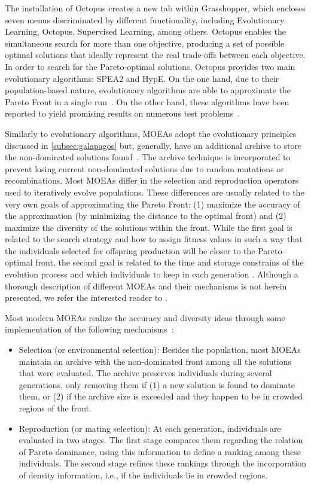 The installation of Octopus creates a new tab within Grasshopper, which encloses seven menus discriminated by different functionality, including Evolutionary Learning, Octopus, Supervised Learning, among others. Octopus enables the simultaneous search for more than one objective, producing a set of possible optimal solutions that ideally represent the real trade-offs between each objective. In order to search for the Pareto-optimal solutions, Octopus provides two main evolutionary algorithms: \ac{SPEA2} and \ac{HypE}. On the one hand, due to their population-based nature, evolutionary algorithms are able to approximate the Pareto Front in a single run~\cite{Zhou2011}. On the other hand, these algorithms have been reported to yield promising results on numerous test problems~\cite{Zitzler2001SPEA2,Zitzler2011HypE}.

Similarly to evolutionary algorithms, \acp{MOEA} adopt the evolutionary principles discussed in \cref{subsec:galapagos} but, generally, have an additional archive to store the non-dominated solutions found~\cite{Zitzler2001SPEA2}. The archive technique is incorporated to prevent losing current non-dominated solutions due to random mutations or recombinations. Most \acp{MOEA} differ in the selection and reproduction operators used to iteratively evolve populations. These differences are usually related to the very own goals of approximating the Pareto Front: (1) maximize the accuracy of the approximation (by minimizing the distance to the optimal front) and (2) maximize the diversity of the solutions within the front. While the first goal is related to the search strategy and how to assign fitness values in such a way that the individuals selected for offspring production will be closer to the Pareto-optimal front, the second goal is related to the time and storage constrains of the evolution process and which individuals to keep in each generation \cite{Zitzler2001SPEA2}. Although a thorough description of different \acp{MOEA} and their mechanisms is not herein presented, we refer the interested reader to \cite{Zhou2011}. 
	
Most modern \acp{MOEA} realize the accuracy and diversity ideas through some implementation of the following mechanisms~\cite{Zitzler2001SPEA2}:	
\begin{itemize}
\item Selection (or environmental selection): Besides the population, most \acp{MOEA} maintain an archive with the non-dominated front among all the solutions that were evaluated. The archive preserves individuals during several generations, only removing them if (1) a new solution is found to dominate them, or (2) if the archive size is exceeded and they happen to be in crowded regions of the front.

\item Reproduction (or mating selection): At each generation, individuals are evaluated in two stages. The first stage compares them regarding the relation of Pareto dominance, using this information to define a ranking among these individuals. The second stage refines these rankings through the incorporation of density information, i.e., if the individuals lie in crowded regions.
\end{itemize}

